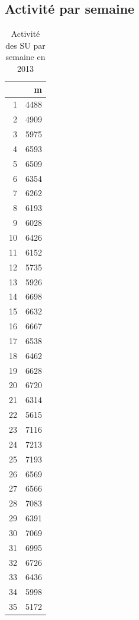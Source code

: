 \documentclass[12pt,english,french,twoside]{report}\usepackage[]{graphicx}\usepackage[]{color}
\begin{document}
\subsection*{Activité par semaine}

\begin{table}[ht]
\centering
\begin{tabular}{rr}
  \hline
 & m \\ 
  \hline
1 & 4488 \\ 
  2 & 4909 \\ 
  3 & 5975 \\ 
  4 & 6593 \\ 
  5 & 6509 \\ 
  6 & 6354 \\ 
  7 & 6262 \\ 
  8 & 6193 \\ 
  9 & 6028 \\ 
  10 & 6426 \\ 
  11 & 6152 \\ 
  12 & 5735 \\ 
  13 & 5926 \\ 
  14 & 6698 \\ 
  15 & 6632 \\ 
  16 & 6667 \\ 
  17 & 6538 \\ 
  18 & 6462 \\ 
  19 & 6628 \\ 
  20 & 6720 \\ 
  21 & 6314 \\ 
  22 & 5615 \\ 
  23 & 7116 \\ 
  24 & 7213 \\ 
  25 & 7193 \\ 
  26 & 6569 \\ 
  27 & 6566 \\ 
  28 & 7083 \\ 
  29 & 6391 \\ 
  30 & 7069 \\ 
  31 & 6995 \\ 
  32 & 6726 \\ 
  33 & 6436 \\ 
  34 & 5998 \\ 
  35 & 5172 \\ 
   \hline
\end{tabular}
\caption[Activité par semaine]{Activité des SU par semaine en 2013} 
\label{act_sem}
\end{table}
\end{document}
